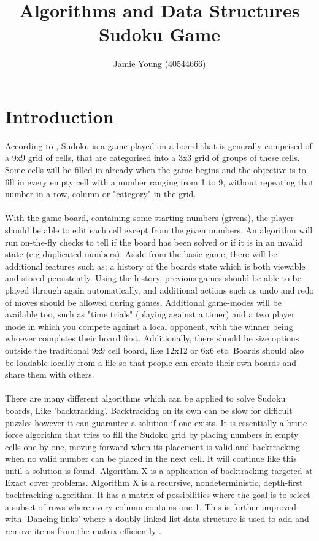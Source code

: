 \documentclass{article}
\title{Algorithms and Data Structures Sudoku Game }
\author{Jamie Young (40544666)}
\date{}
\begin{document}
\maketitle

\section{Introduction}
According to \parencite{sudoku2024beginners}, Sudoku is a game played on a board that is generally comprised of a 9x9 grid of cells, that are categorised into a 3x3 grid of groups of these cells. Some cells will be filled in already when the game begins and the objective is to fill in every empty cell with a number ranging from 1 to 9, without repeating that number in a row, column or "category" in the grid. \\\\
With the game board, containing some starting numbers (givens), the player should be able to edit each cell except from the given numbers. An algorithm will run on-the-fly checks to tell if the board has been solved or if it is in an invalid state (e.g duplicated numbers).
Aside from the basic game, there will be additional features such as; a history of the boards state which is both viewable and stored persistently. Using the history, previous games should be able to be played through again automatically, and additional actions such as undo and redo of moves should be allowed during games. Additional game-modes will be available too, such as "time trials" (playing against a timer) and a two player mode in which you compete against a local opponent, with the winner being whoever completes their board first. Additionally, there should be size options outside the traditional 9x9 cell board, like 12x12 or 6x6 etc. Boards should also be loadable locally from a file so that people can create their own boards and share them with others.\\\\
There are many different algorithms which can be applied to solve Sudoku boards, Like 'backtracking'. Backtracking on its own can be slow for difficult puzzles however it can guarantee a solution if one exists. It is essentially a brute-force algorithm that tries to fill the Sudoku grid by placing numbers in empty cells one by one, moving forward when its placement is valid and backtracking when no valid number can be placed in the next cell. It will continue like this until a solution is found. Algorithm X is a application of backtracking targeted at Exact cover problems. Algorithm X is a recursive, nondeterministic, depth-first backtracking algorithm. It has a matrix of possibilities where the goal is to select a subset of rows where every column contains one 1. This is further improved with 'Dancing links' where a doubly linked list data structure is used to add and remove items from the matrix efficiently  \parencite{knuth2000}.
\end{document}

